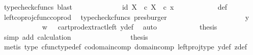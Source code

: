 \begin{isabellebody}
\ {\isacharparenleft}{\kern0pt}typecheck{\isacharunderscore}{\kern0pt}cfuncs{\isacharcomma}{\kern0pt}\ blast{\isacharparenright}{\kern0pt}\isanewline
\ \ \ \ \ \ \ \ \isamarkupfalse%
\ \isamarkupfalse%
\ {\isachardoublequoteopen}{\isachardot}{\kern0pt}{\isachardot}{\kern0pt}{\isachardot}{\kern0pt}\ {\isacharequal}{\kern0pt}\ {\isasymlangle}id\ X{\isacharcomma}{\kern0pt}\ {\isasymt}\ {\isasymcirc}\isactrlsub c\ {\isasymbeta}\isactrlbsub X\isactrlesub {\isasymrangle}\ \ {\isasymcirc}\isactrlsub c\ x{\isachardoublequoteclose}\isanewline
\ \ \ \ \ \ \ \ \ \ \isamarkupfalse%
\ {\isasymrho}{\isacharunderscore}{\kern0pt}def\ \ \isamarkupfalse%
\ left{\isacharunderscore}{\kern0pt}coproj{\isacharunderscore}{\kern0pt}cfunc{\isacharunderscore}{\kern0pt}coprod\ \isamarkupfalse%
\ {\isacharparenleft}{\kern0pt}typecheck{\isacharunderscore}{\kern0pt}cfuncs{\isacharcomma}{\kern0pt}\ presburger{\isacharparenright}{\kern0pt}\ \ \ \ \ \ \ \ \isanewline
\ \ \ \ \ \ \ \ \isamarkupfalse%
\ \isamarkupfalse%
\ {\isachardoublequoteopen}{\isachardot}{\kern0pt}{\isachardot}{\kern0pt}{\isachardot}{\kern0pt}\ {\isacharequal}{\kern0pt}\ y{\isachardoublequoteclose}\isanewline
\ \ \ \ \ \ \ \ \ \ \isamarkupfalse%
\ {\isacartoucheopen}w\ {\isacharequal}{\kern0pt}\ {\isasymt}{\isacartoucheclose}\ cart{\isacharunderscore}{\kern0pt}prod{\isacharunderscore}{\kern0pt}extract{\isacharunderscore}{\kern0pt}left\ y{\isacharunderscore}{\kern0pt}def\ \isamarkupfalse%
\ auto\isanewline
\ \ \ \ \ \ \ \ \isamarkupfalse%
\ \isamarkupfalse%
\ {\isacharquery}{\kern0pt}thesis\isanewline
\ \ \ \ \ \ \ \ \ \ \isamarkupfalse%
\ {\isacharparenleft}{\kern0pt}simp\ add{\isacharcolon}{\kern0pt}\ calculation{\isacharparenright}{\kern0pt}\isanewline
\ \ \ \ \ \ \isamarkupfalse%
\isanewline
\ \ \ \ \ \ \isamarkupfalse%
\ \isamarkupfalse%
\ {\isacharquery}{\kern0pt}thesis\isanewline
\ \ \ \ \ \ \ \ \isamarkupfalse%
\ {\isacharparenleft}{\kern0pt}metis\ {\isasymrho}{\isacharunderscore}{\kern0pt}type\ cfunc{\isacharunderscore}{\kern0pt}type{\isacharunderscore}{\kern0pt}def\ codomain{\isacharunderscore}{\kern0pt}comp\ domain{\isacharunderscore}{\kern0pt}comp\ left{\isacharunderscore}{\kern0pt}proj{\isacharunderscore}{\kern0pt}type\ y{\isacharunderscore}{\kern0pt}def\ z{\isacharunderscore}{\kern0pt}def{\isacharparenright}{\kern0pt}\isanewline
\ \ \ \ \isamarkupfalse%

\end{isabellebody}
